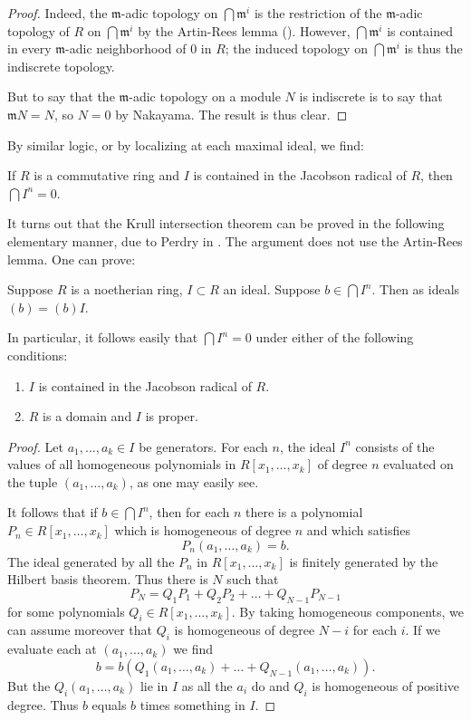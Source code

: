 \begin{proof} 
Indeed, the $\mathfrak{m}$-adic topology on $\bigcap \mathfrak{m}^i$ is the
restriction of the $\mathfrak{m}$-adic topology of $R$ on $\bigcap
\mathfrak{m}^i$ by the Artin-Rees lemma (). 
However, $\bigcap \mathfrak{m}^i$ is contained in every $\mathfrak{m}$-adic
neighborhood of $0$ in $R$; the induced topology on $\bigcap \mathfrak{m}^i$
is thus the indiscrete topology. 

But to say that the $\mathfrak{m}$-adic topology on a module $N$ is indiscrete
is to say that $\mathfrak{m}N=N$, so $N=0$ by Nakayama. The result is thus
clear.

\end{proof} 

By similar logic, or by localizing at each maximal ideal, we find:
\begin{corollary} 
If $R$ is a commutative ring and $I $ is contained in the Jacobson radical of
$R$, then $\bigcap I^n = 0$.
\end{corollary} 

It turns out that the Krull intersection theorem can be proved in the
following elementary manner, due to Perdry in \cite{Pe04}. The argument does
not use the Artin-Rees lemma. One can prove:

\begin{theorem}[\cite{Pe04}]
Suppose $R$ is a noetherian ring, $I \subset R$ an ideal. Suppose $b \in
\bigcap I^n$. Then as ideals $(b) = (b)I$.
\end{theorem} 
In particular, it follows easily that $\bigcap I^n = 0$ under either of the
following conditions:
\begin{enumerate}
\item  $I$ is contained in the Jacobson radical of $R$.
\item $R$ is a domain and $I$ is proper.
\end{enumerate}

\begin{proof} 
Let $a_1, \dots, a_k \in I$ be generators. 
For each $n$, the ideal $I^n$ consists of the values of all homogeneous
polynomials  in $R[x_1, \dots, x_k]$ of degree $n$ evaluated on the tuple
$(a_1, \dots, a_k)$, as one may easily see. 

It follows that if $b \in \bigcap I^n$, then for each $n$ there is a polynomial
$P_n \in
R[x_1, \dots, x_k]$ which is homogeneous of degree $n$ and which satisfies
\[ P_n(a_1, \dots, a_k) = b.  \]
The ideal generated by all the $P_n$ in $R[x_1, \dots, x_k]$ is finitely
generated by the Hilbert basis theorem. Thus there is $N$ such that
\[ P_N = Q_1 P_1 + Q_2 P_2 + \dots + Q_{N-1} P_{N-1}  \]
for some polynomials $Q_i \in R[x_1, \dots, x_k]$. By taking homogeneous
components, we can assume moreover that $Q_i$ is homogeneous of degree $N-i$
for each $i$. If we evaluate each at
$(a_1, \dots, a_k)$ we find
\[ b = b (Q_1(a_1, \dots,a_k) + \dots + Q_{N-1}(a_1, \dots, a_k)).  \]
But the $Q_i(a_1, \dots, a_k)$ lie in $I$ as all the $a_i$ do and $Q_i$ is
homogeneous of positive degree. Thus $b$ equals $b$ times something in $I$.
\end{proof} 

